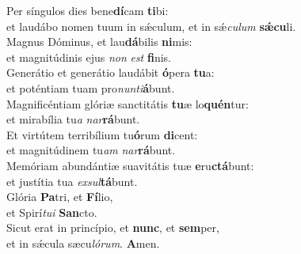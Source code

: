 \evenverse Per síngulos dies bene\textbf{dí}cam \textbf{ti}bi:~\*\\
\evenverse et laudábo nomen tuum in sǽculum, et in sǽ\textit{cu}\textit{lum} \textbf{sǽ}\textbf{cu}li.\\
\oddverse Magnus Dóminus, et lau\textbf{dá}bilis \textbf{ni}mis:~\*\\
\oddverse et magnitúdinis ejus \textit{non} \textit{est} \textbf{fi}nis.\\
\evenverse Generátio et generátio laudábit \textbf{ó}pera \textbf{tu}a:~\*\\
\evenverse et poténtiam tuam pro\textit{nun}\textit{ti}\textbf{á}bunt.\\
\oddverse Magnificéntiam glóriæ sanctitátis \textbf{tu}æ lo\textbf{quén}tur:~\*\\
\oddverse et mirabília tu\textit{a} \textit{nar}\textbf{rá}bunt.\\
\evenverse Et virtútem terribílium tu\textbf{ó}rum \textbf{di}cent:~\*\\
\evenverse et magnitúdinem tu\textit{am} \textit{nar}\textbf{rá}bunt.\\
\oddverse Memóriam abundántiæ suavitátis tuæ \textbf{e}ru\textbf{ctá}bunt:~\*\\
\oddverse et justítia tua \textit{ex}\textit{sul}\textbf{tá}bunt.\\
\evenverse Glória \textbf{Pa}tri, et \textbf{Fí}lio,~\*\\
\evenverse et Spirí\textit{tu}\textit{i} \textbf{San}cto.\\
\oddverse Sicut erat in princípio, et \textbf{nunc}, et \textbf{sem}per,~\*\\
\oddverse et in sǽcula sæcu\textit{ló}\textit{rum}. \textbf{A}men.\\
